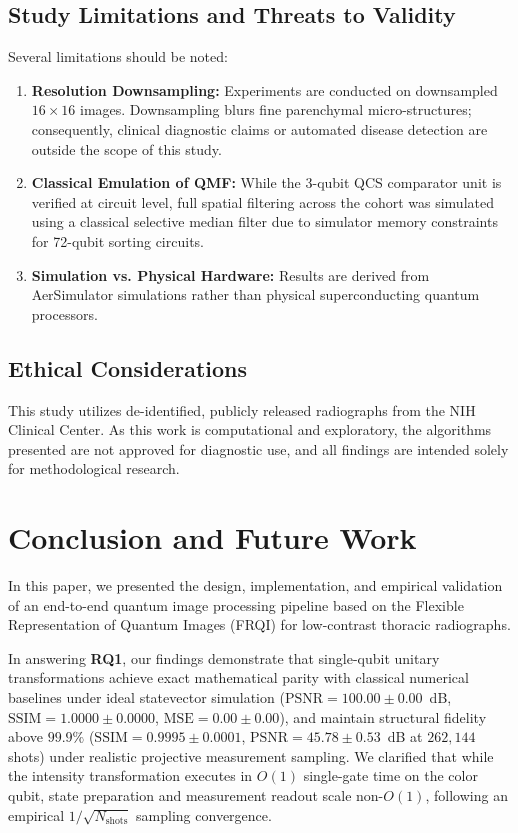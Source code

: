 \documentclass[12pt,onecolumn,draftclsnofoot]{IEEEtran}
\begin{document}
\subsection{Study Limitations and Threats to Validity}
Several limitations should be noted:
\begin{enumerate}
    \item \textbf{Resolution Downsampling:} Experiments are conducted on downsampled $16\times16$ images. Downsampling blurs fine parenchymal micro-structures; consequently, clinical diagnostic claims or automated disease detection are outside the scope of this study.
    \item \textbf{Classical Emulation of QMF:} While the 3-qubit QCS comparator unit is verified at circuit level, full spatial filtering across the cohort was simulated using a classical selective median filter due to simulator memory constraints for 72-qubit sorting circuits.
    \item \textbf{Simulation vs. Physical Hardware:} Results are derived from AerSimulator simulations rather than physical superconducting quantum processors.
\end{enumerate}

\subsection{Ethical Considerations}
This study utilizes de-identified, publicly released radiographs from the NIH Clinical Center. As this work is computational and exploratory, the algorithms presented are not approved for diagnostic use, and all findings are intended solely for methodological research.

\section{Conclusion and Future Work}
In this paper, we presented the design, implementation, and empirical validation of an end-to-end quantum image processing pipeline based on the Flexible Representation of Quantum Images (FRQI) for low-contrast thoracic radiographs.

In answering \textbf{RQ1}, our findings demonstrate that single-qubit unitary transformations achieve exact mathematical parity with classical numerical baselines under ideal statevector simulation ($\text{PSNR} = 100.00 \pm 0.00$~dB, $\text{SSIM} = 1.0000 \pm 0.0000$, $\text{MSE} = 0.00 \pm 0.00$), and maintain structural fidelity above $99.9\%$ ($\text{SSIM} = 0.9995 \pm 0.0001$, $\text{PSNR} = 45.78 \pm 0.53$~dB at $262{,}144$ shots) under realistic projective measurement sampling. We clarified that while the intensity transformation executes in $O(1)$ single-gate time on the color qubit, state preparation and measurement readout scale non-$O(1)$, following an empirical $1/\sqrt{N_{\text{shots}}}$ sampling convergence.
\end{document}
